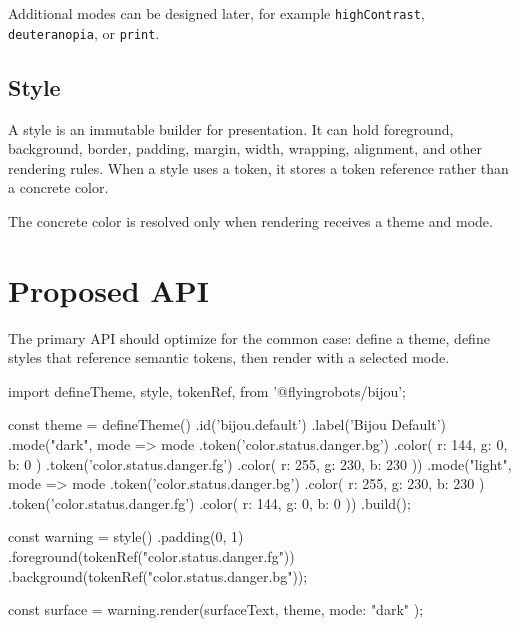 Additional modes can be designed later, for example \texttt{h\allowbreak{}i\allowbreak{}g\allowbreak{}h\allowbreak{}C\allowbreak{}o\allowbreak{}n\allowbreak{}t\allowbreak{}r\allowbreak{}a\allowbreak{}s\allowbreak{}t}, \texttt{d\allowbreak{}e\allowbreak{}u\allowbreak{}t\allowbreak{}e\allowbreak{}r\allowbreak{}a\allowbreak{}n\allowbreak{}o\allowbreak{}p\allowbreak{}i\allowbreak{}a}, or \texttt{p\allowbreak{}r\allowbreak{}i\allowbreak{}n\allowbreak{}t}.

\subsection{Style}\label{record-178-style}

A style is an immutable builder for presentation. It can hold foreground, background, border, padding, margin, width, wrapping, alignment, and other rendering rules. When a style uses a token, it stores a token reference rather than a concrete color.

The concrete color is resolved only when rendering receives a theme and mode.

\section{Proposed API}\label{record-178-proposed-api}

The primary API should optimize for the common case: define a theme, define styles that reference semantic tokens, then render with a selected mode.

\begin{CodeBlock}
import {
  defineTheme,
  style,
  tokenRef,
} from '@flyingrobots/bijou';

const theme = defineTheme()
  .id('bijou.default')
  .label('Bijou Default')
  .mode("dark", mode => mode
    .token('color.status.danger.bg')
    .color({ r: 144, g: 0, b: 0 })
    .token('color.status.danger.fg')
    .color({ r: 255, g: 230, b: 230 }))
  .mode("light", mode => mode
    .token('color.status.danger.bg')
    .color({ r: 255, g: 230, b: 230 })
    .token('color.status.danger.fg')
    .color({ r: 144, g: 0, b: 0 }))
  .build();

const warning = style()
  .padding(0, 1)
  .foreground(tokenRef("color.status.danger.fg"))
  .background(tokenRef("color.status.danger.bg"));

const surface = warning.render(surfaceText, { theme, mode: "dark" });
\end{CodeBlock}

